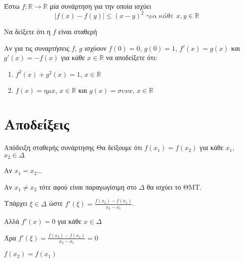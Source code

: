 \documentclass{presentation}
\begin{document}
\begin{askisi}
    Έστω $f:\mathbb{R}\to\mathbb{R}$ μία συνάρτηση για την οποία ισχύει
    $$|f(x)-f(y)|\le (x-y)^2 \text{ για κάθε } x,y\in\mathbb{R}$$

    Να δείξετε ότι η $f$ είναι σταθερή

\end{askisi}

\begin{askisi}
    Αν για τις συναρτήσεις $f$, $g$ ισχύουν $f(0)=0$, $g(0)=1$, $f'(x)=g(x)$ και $g'(x)=-f(x)$ για κάθε $x\in\mathbb{R}$ να αποδείξετε ότι:
    \begin{enumerate}
        \item<1-> $f^2(x)+g^2(x)=1$, $x\in\mathbb{R}$
        \item<2-> $f(x)=ημx$, $x\in\mathbb{R}$ και $g(x)=συνx$, $x\in\mathbb{R}$
    \end{enumerate}

\end{askisi}


\appendix

\section{Αποδείξεις}
\begin{frame}{Απόδειξη σταθερής συνάρτησης}
    Θα δείξουμε ότι $f(x_1)=f(x_2)$ για κάθε $x_1$, $x_2\in Δ$

     Αν $x_1=x_2$...

     Αν $x_1\ne x_2$ τότε αφού είναι παραγωγίσιμη στο $Δ$ θα ισχύει το ΘΜΤ.

     Υπάρχει $ξ\in Δ$ ώστε $f'(ξ)=\frac{f(x_2)-f(x_1)}{x_2-x_1}$.

     Αλλά $f'(x)=0$ για κάθε $x\in Δ$

     Άρα $f'(ξ)=\frac{f(x_2)-f(x_1)}{x_2-x_1}=0$

     $f(x_2)=f(x_1)$
\end{frame}
\end{document}
